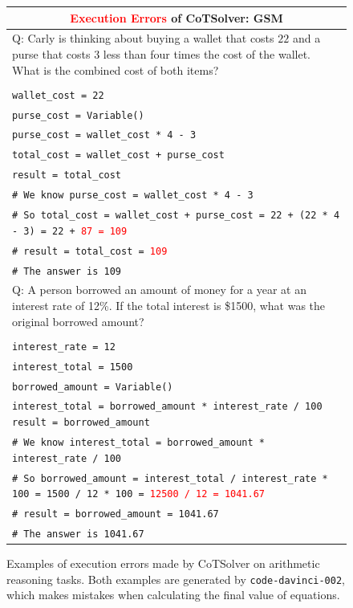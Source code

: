 \documentclass{article}
\theoremstyle{definition}
\newcommand\ttsmall[1]{\texttt{\small #1}}
\newcommand{\gsm}{\textsc{GSM}}
\begin{document}
\begin{figure}[h]
\footnotesize
    \centering
    \begin{tabularx}{\linewidth}{X}
    \toprule
       \multicolumn{1}{c}{\bf \textcolor{red}{Execution Errors} of {\sc CoTSolver}: \gsm{}}  \\
         \midrule
    Q: Carly is thinking about buying a wallet that costs $22$ and a purse that costs $3$ less than four times the cost of the wallet. What is the combined cost of both items? \\
    \\
 \tt  wallet\_cost = 22 \\
 \tt   purse\_cost = Variable() \\
  \tt  purse\_cost = wallet\_cost * 4 - 3 \\
  \tt  total\_cost = wallet\_cost + purse\_cost \\
  \tt  result = total\_cost \\
  \tt  \# We know purse\_cost = wallet\_cost * 4 - 3 \\ 
  \tt  \# So total\_cost = wallet\_cost + purse\_cost = 22 + (22 * 4 - 3) = 22 + \textcolor{red}{87  = 109} \\
  \tt  \# result = total\_cost = \textcolor{red}{109} \\
   \tt \# The answer is 109 \\
    \midrule
       Q: A person borrowed an amount of money for a year at an interest rate of 12\%. If the total interest is \$1500, what was the original borrowed amount? \\
       \\
  \tt  interest\_rate = 12\\
  \tt  interest\_total = 1500\\
   \tt borrowed\_amount = Variable()\\
  \tt  interest\_total = borrowed\_amount * interest\_rate / 100
   \tt result = borrowed\_amount\\
   \tt \# We know interest\_total = borrowed\_amount * interest\_rate / 100\\
  \tt  \# So borrowed\_amount = interest\_total / interest\_rate * 100 = 1500 / 12 * 100 = \textcolor{red}{12500 / 12 = 1041.67}\\
  \tt \# result = borrowed\_amount = 1041.67 \\
  \tt  \# The answer is 1041.67\\
\bottomrule
    \end{tabularx}
    \caption{Examples of execution errors made by {\sc CoTSolver} on arithmetic reasoning tasks. Both examples are generated by \ttsmall{code-davinci-002}, which makes mistakes when calculating the final value of equations.}
    \label{fig:gsm_cotsolver_err_exec}
\end{figure}
\end{document}
